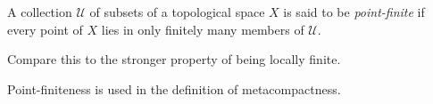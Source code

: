 \documentclass[12pt]{article}
\begin{document}
A collection $\mathcal{U}$ of subsets of a topological space $X$ is said to be \emph{point-finite} if every point of $X$ lies in only finitely many members of $\mathcal{U}$.

Compare this to the stronger property of being locally finite.

Point-finiteness is used in the definition of metacompactness.
\end{document}
